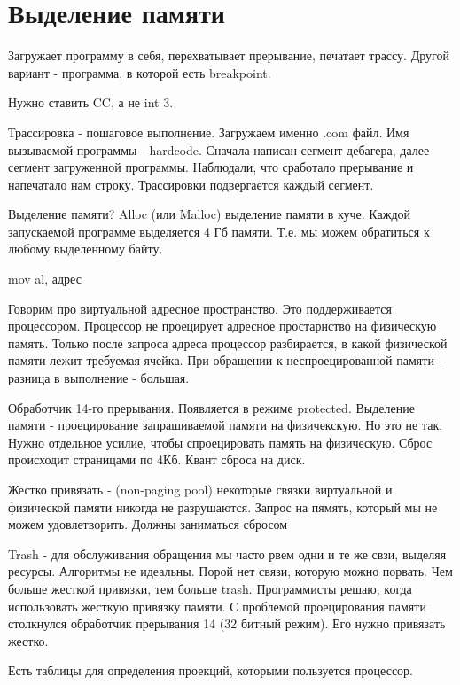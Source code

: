 \section{Выделение памяти}
Загружает программу в себя, перехватывает прерывание, печатает трассу. 
Другой вариант - программа, в которой есть breakpoint. 
\begin{rem}Нужно ставить CC, а не int 3.\end{rem}

Трассировка - пошаговое выполнение. Загружаем именно .com файл. Имя вызываемой программы - hardcode. Сначала написан сегмент дебагера, далее сегмент загруженной программы. Наблюдали, что сработало прерывание и напечатало нам строку. Трассировки подвергается каждый сегмент. 

Выделение памяти? Alloc (или Malloc) выделение памяти в куче. Каждой запускаемой программе выделяется 4 Гб памяти. Т.е. мы можем обратиться к любому выделенному байту. 

mov al, адрес

Говорим про виртуальной адресное пространство. Это поддерживается процессором. Процессор не проецирует адресное простарнство на физическую память. Только после запроса адреса процессор разбирается, в какой физической памяти лежит требуемая ячейка. При обращении к неспроецированной памяти - разница в выполнение - большая. 

Обработчик 14-го прерывания. Появляется в режиме protected. Выделение памяти - проецирование запрашиваемой памяти на физичекскую. Но это не так. Нужно отдельное усилие, чтобы спроецировать память на физическую. Сброс происходит страницами по 4Кб. Квант сброса на диск.  

\begin{rem} Жестко привязать - (non-paging pool) некоторые связки виртуальной и физической памяти никогда не разрушаются. Запрос на пямять, который мы не можем удовлетворить. Должны заниматься сбросом\end{rem}


Trash - для обслуживания обращения мы часто рвем одни и те же свзи, выделяя ресурсы. Алгоритмы не идеальны. Порой нет связи, которую можно порвать. Чем больше жесткой привязки, тем больше trash.
Программисты решаю, когда использовать жесткую привязку памяти. С проблемой проецирования памяти столкнулся обработчик прерывания 14 (32 битный режим). Его нужно привязать жестко.

Есть таблицы для определения проекций, которыми пользуется процессор.

